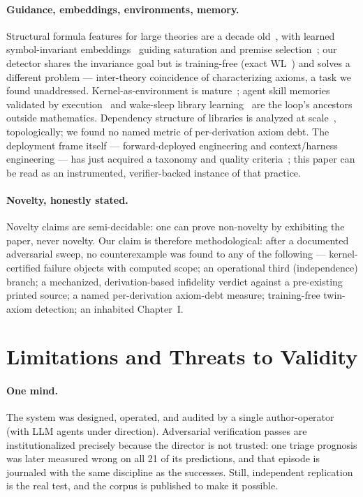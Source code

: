 \documentclass[11pt]{article}
\theoremstyle{remark}\newtheorem{example}{Example}
\begin{document}
\paragraph{Guidance, embeddings, environments, memory.}
Structural formula features for large theories are a decade
old~\cite{kaliszyk2015features}, with learned symbol-invariant
embeddings~\cite{olsak2020invariant,jakubuv2020enigma} guiding saturation and premise
selection~\cite{alemi2016deepmath,mikula2023magnushammer}; our detector shares the
invariance goal but is training-free (exact WL~\cite{shervashidze2011wl}) and solves
a different problem --- inter-theory coincidence of characterizing axioms, a task we
found unaddressed. Kernel-as-environment is
mature~\cite{yang2019coqgym,lample2022htps,polu2020gptf}; agent skill memories
validated by execution~\cite{wang2023voyager} and wake-sleep library
learning~\cite{ellis2021dreamcoder} are the loop's ancestors outside mathematics.
Dependency structure of libraries is analyzed at
scale~\cite{mathlibnetwork2026,atlas2026}, topologically; we found no named metric of
per-derivation axiom debt. The deployment frame itself --- forward-deployed
engineering and context/harness engineering --- has just acquired a taxonomy and
quality criteria~\cite{fde2026taxonomy,contextengineering2026}; this paper can be
read as an instrumented, verifier-backed instance of that practice.

\paragraph{Novelty, honestly stated.}
Novelty claims are semi-decidable: one can prove non-novelty by exhibiting the paper,
never novelty. Our claim is therefore methodological: after a documented adversarial
sweep, no counterexample was found to any of the following --- kernel-certified
failure objects with computed scope; an operational third (independence) branch; a
mechanized, derivation-based infidelity verdict against a pre-existing printed source;
a named per-derivation axiom-debt measure; training-free twin-axiom detection; an
inhabited Chapter~I.

\section{Limitations and Threats to Validity}
\label{sec:limitations}
\paragraph{One mind.} The system was designed, operated, and audited by a single
author-operator (with LLM agents under direction). Adversarial verification passes are
institutionalized precisely because the director is not trusted: one triage prognosis
was later measured wrong on all 21 of its predictions, and that episode is journaled
with the same discipline as the successes. Still, independent replication is the real
test, and the corpus is published to make it possible.
\end{document}
